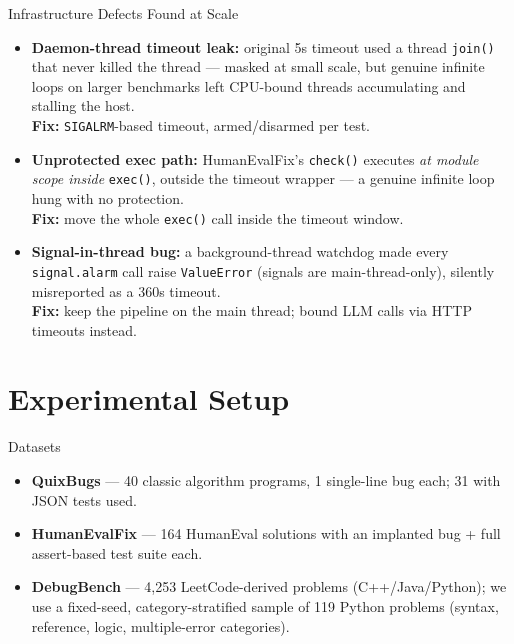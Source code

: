 \documentclass[aspectratio=169]{beamer}
\begin{document}
\begin{frame}{Infrastructure Defects Found at Scale}
\small
\begin{itemize}
    \item \textbf{Daemon-thread timeout leak:} original 5s timeout used a thread \texttt{join()} that never killed the thread --- masked at small scale, but genuine infinite loops on larger benchmarks left CPU-bound threads accumulating and stalling the host. \\ \textbf{Fix:} \texttt{SIGALRM}-based timeout, armed/disarmed per test.
    \item \textbf{Unprotected exec path:} HumanEvalFix's \texttt{check()} executes \emph{at module scope inside} \texttt{exec()}, outside the timeout wrapper --- a genuine infinite loop hung with no protection. \\ \textbf{Fix:} move the whole \texttt{exec()} call inside the timeout window.
    \item \textbf{Signal-in-thread bug:} a background-thread watchdog made every \texttt{signal.alarm} call raise \texttt{ValueError} (signals are main-thread-only), silently misreported as a 360s timeout. \\ \textbf{Fix:} keep the pipeline on the main thread; bound LLM calls via HTTP timeouts instead.
\end{itemize}
\end{frame}

\section{Experimental Setup}

\begin{frame}{Datasets}
\begin{itemize}
    \item \textbf{QuixBugs} --- 40 classic algorithm programs, 1 single-line bug each; 31 with JSON tests used.
    \item \textbf{HumanEvalFix} --- 164 HumanEval solutions with an implanted bug + full assert-based test suite each.
    \item \textbf{DebugBench} --- 4{,}253 LeetCode-derived problems (C++/Java/Python); we use a fixed-seed, category-stratified sample of 119 Python problems (syntax, reference, logic, multiple-error categories).
\end{itemize}
\end{frame}
\end{document}
